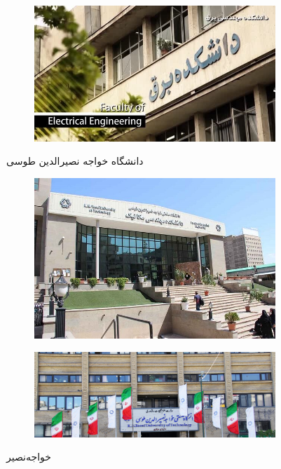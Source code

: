 \begin{figure}[h!]
\begin{subfigure}{0.33\textwidth}
			\label{f62}
		\end{subfigure}\hfil %
        \begin{subfigure}{0.33\textwidth}
			\includegraphics[width=\linewidth]{Images/Chapter6/test3.jpg}
			\caption{}
			\label{f63}
        \end{subfigure}
		\caption{دانشگاه خواجه نصیرالدین طوسی}
		\label{fig:fig1}
\end{figure}
 \begin{figure}[ht]
		\centering %
		\begin{subfigure}{0.45\textwidth}
			\includegraphics[width=\linewidth, height=0.2\textheight]{Images/Chapter6/test5.jpg}
			\caption{}
			\label{f64}
		\end{subfigure}\hfil %
		\begin{subfigure}{0.45\textwidth}
			\includegraphics[width=\linewidth, height=0.2\textheight]{Images/Chapter6/test6.jpg}
			\caption{}
			\label{f65}
		\end{subfigure}
		\caption{خواجه‌نصیر}
		\label{fig:fig2}
\end{figure}
